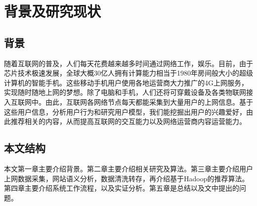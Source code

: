 \chapter{背景及研究现状}

\section{背景}
随着互联网的普及，人们每天花费越来越多时间通过网络工作，娱乐。目前，由于芯片技术极速发展，全球大概30亿人拥有计算能力相当于1980年房间般大小的超级计算机的智能手机。这些移动手机用户使用各地运营商大力推广的4G上网服务，实现随时随地上网的梦想。除了电脑和手机，人们还将可穿戴设备及各类物联网接入互联网中。由此，互联网各网络节点每天都能采集到大量用户的上网信息。基于这些用户信息，分析用户行为和研究用户模型，我们能挖掘出用户的兴趣爱好，由此推荐相关的内容，从而提高互联网的交互能力以及网络运营商内容运营能力。

\section{本文结构}
本文第一章主要介绍背景。第二章主要介绍相关研究及算法。第三章主要介绍用户上网数据采集，网站语义分析，数据清洗转存，再介绍基于Hadoop的推荐算法。第四章主要介绍系统工作流程，以及实证分析。第五章是总结以及文中提出的问题。